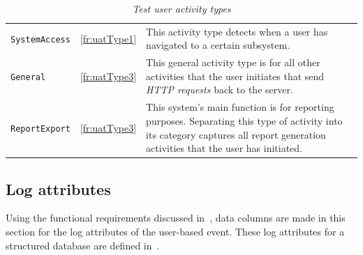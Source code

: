 \clearpage

\begin{table}[!htb]
	\centering
	\caption[Test user activity types]{\textit{Test user activity types}}
	\label{tbl:ch3_testActivityTypes}
	\begin{tabularx}{\textwidth}{llX}
		\toprule
		\thead{Activity} & \thead{Functional requirement} & \thead{Description} \\
		\midrule
		\rowcolor{lightgray}
		\texttt{SystemAccess} & \ref{fr:uatType1} & \RaggedRight This activity type detects when a user has navigated to a certain subsystem. \\ 
		\texttt{General} & \ref{fr:uatType3} & \RaggedRight This general activity type is for all other activities that the user initiates that send \textit{HTTP requests} back to the server. \\
		\rowcolor{lightgray}
		\texttt{ReportExport} & \ref{fr:uatType3} & \RaggedRight This system's main function is for reporting purposes. Separating this type of activity into its category captures all report generation activities that the user has initiated. \\ 
		\bottomrule
	\end{tabularx}
\end{table}

\subsection{Log attributes}\label{sec:ch3_implementationLogAtrributes}
Using the functional requirements discussed in~, data columns are made in this section for the log attributes of the user-based event. These log attributes for a structured database are defined in~. 

